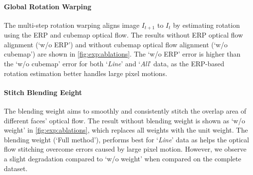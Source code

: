 \paragraph{Global Rotation Warping}
The multi-step rotation warping aligns image $I_{t+1}$ to $I_t$ by estimating rotation using the ERP and cubemap optical flow.
The results without ERP optical flow alignment (`w/o ERP') and without cubemap optical flow alignment (`w/o cubemap') are shown in \cref{fig:exp:ablations}.
The `w/o ERP' error is higher than the `w/o cubemap' error for both `\emph{Line}' and `\emph{All}' data,
as the ERP-based rotation estimation better handles large pixel motions.


\paragraph{Stitch Blending Eeight}
The blending weight aims to smoothly and consistently stitch the overlap area of different faces' optical flow.
The result without blending weight is shown as `w/o weight' in \cref{fig:exp:ablations}, which replaces all weights with the unit weight.
The blending weight (`Full method'), performs best for `\emph{Line}' data as helps the optical flow stitching overcome errors caused by large pixel motion.
However, we observe a slight degradation compared to `w/o weight' when compared on the complete dataset.


